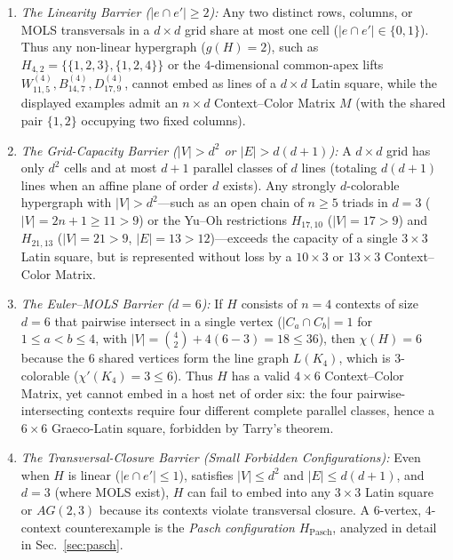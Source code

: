 \documentclass[aps,pra,reprint,superscriptaddress,longbibliography,nofootinbib,floatfix,10pt]{revtex4-2}
\theoremstyle{definition}\newtheorem{definition}[theorem]{Definition}
\theoremstyle{remark}\newtheorem{remark}[theorem]{Remark}
\begin{document}
\begin{enumerate}
\item \emph{The Linearity Barrier ($|e\cap e'|\ge 2$):} Any two distinct rows, columns, or MOLS transversals in a $d\times d$ grid share at most one cell ($|e\cap e'|\in\{0,1\}$). Thus any non-linear hypergraph ($g(H)=2$), such as $H_{4,2}=\{\{1,2,3\},\{1,2,4\}\}$ or the $4$-dimensional common-apex lifts $W_{11,5}^{(4)},B_{14,7}^{(4)},D_{17,9}^{(4)}$, cannot embed as lines of a $d\times d$ Latin square, while the displayed examples admit an $n\times d$ Context--Color Matrix $M$ (with the shared pair $\{1,2\}$ occupying two fixed columns).
\item \emph{The Grid-Capacity Barrier ($|V|>d^2$ or $|E|>d(d+1)$):} A $d\times d$ grid has only $d^2$ cells and at most $d+1$ parallel classes of $d$ lines (totaling $d(d+1)$ lines when an affine plane of order $d$ exists). Any strongly $d$-colorable hypergraph with $|V|>d^2$—such as an open chain of $n\ge 5$ triads in $d=3$ ($|V|=2n+1\ge 11>9$) or the Yu--Oh restrictions $H_{17,10}$ ($|V|=17>9$) and $H_{21,13}$ ($|V|=21>9$, $|E|=13>12$)—exceeds the capacity of a single $3\times 3$ Latin square, but is represented without loss by a $10\times 3$ or $13\times 3$ Context--Color Matrix.
\item \emph{The Euler--MOLS Barrier ($d=6$):} If $H$ consists of $n=4$ contexts of size $d=6$ that pairwise intersect in a single vertex ($|C_a\cap C_b|=1$ for $1\le a<b\le 4$, with $|V|=\binom{4}{2}+4(6-3)=18\le 36$), then $\chi(H)=6$ because the $6$ shared vertices form the line graph $L(K_4)$, which is $3$-colorable ($\chi'(K_4)=3\le 6$). Thus $H$ has a valid $4\times 6$ Context--Color Matrix, yet cannot embed in a host net of order six: the four pairwise-intersecting contexts require four different complete parallel classes, hence a $6\times 6$ Graeco-Latin square, forbidden by Tarry's theorem.
\item \emph{The Transversal-Closure Barrier (Small Forbidden Configurations):} Even when $H$ is linear ($|e\cap e'|\le 1$), satisfies $|V|\le d^2$ and $|E|\le d(d+1)$, and $d=3$ (where MOLS exist), $H$ can fail to embed into any $3\times 3$ Latin square or $AG(2,3)$ because its contexts violate transversal closure. A $6$-vertex, $4$-context counterexample is the \emph{Pasch configuration} $H_{\mathrm{Pasch}}$, analyzed in detail in Sec.~\ref{sec:pasch}.
\end{enumerate}

\end{document}
